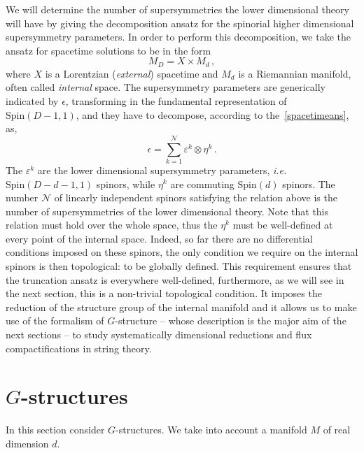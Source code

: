 \documentclass[debug]{phd}
\begin{document}
				We will determine the number of supersymmetries the lower dimensional theory will have by giving the decomposition ansatz for the spinorial higher dimensional supersymmetry parameters.
				In order to perform this decomposition, we take the ansatz for spacetime solutions to be in the form
						\begin{equation}\label{spacetimeans}
							M_{D} = X \times M_{d}\, ,
						\end{equation}
				where $X$ is a Lorentzian (\emph{external}) spacetime and $M_{d}$ is a Riemannian manifold, often called \emph{internal} space.
				The supersymmetry parameters are generically indicated by $\epsilon$, transforming in the fundamental representation of $\mathrm{Spin}(D-1,1)$, and they have to decompose, according to the~\eqref{spacetimeans}, as,
						\begin{equation*}
							\epsilon = \sum_{k=1}^\mathcal{N} \varepsilon^k \otimes \eta^k\, .
						\end{equation*}
				The $\varepsilon^k$ are the lower dimensional supersymmetry parameters, \emph{i.e.} $\mathrm{Spin}(D-d-1,1)$ spinors, while $\eta^k$ are commuting $\mathrm{Spin}(d)$ spinors.
				The number $\mathcal{N}$ of linearly independent spinors satisfying the relation above is the number of supersymmetries of the lower dimensional theory.
				Note that this relation must hold over the whole space, thus the $\eta^k$ must be well-defined at every point of the internal space.
				Indeed, so far there are no differential conditions imposed on these spinors, the only condition we require on the internal spinors is then topological: to be globally defined.
				This requirement ensures that the truncation ansatz is everywhere well-defined, furthermore, as we will see in the next section, this is a non-trivial topological condition. 
				It imposes the reduction of the structure group of the internal manifold and it allows us to make use of the formalism of $G$-structure -- whose description is the major aim of the next sections -- to study systematically dimensional reductions and flux compactifications in string theory.
		\section{\texorpdfstring{$G$-structures}{G-structures}}
			\label{gstruc}
				In this section consider $G$-structures.
				We take into account a manifold $M$ of real dimension $d$.
				
\end{document}
